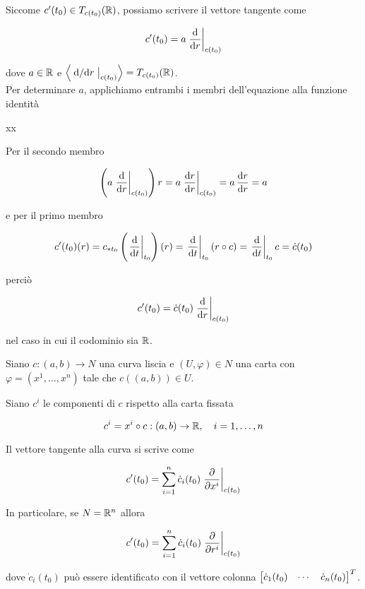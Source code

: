 Siccome $ c'(t_{0}) \in T_{c(t_{0})}(\mathbb{R}) $, possiamo scrivere il vettore tangente come

\begin{equation}
	c'(t_{0}) = a \eval{ \dv{r} }_{c(t_{0})}
\end{equation}

dove $ a \in \mathbb{R} $ e $ \ev{ \eval{ \dv*{r} }_{c(t_{0})} } = T_{c(t_{0})}(\R) $. \\
Per determinare $ a $, applichiamo entrambi i membri dell'equazione alla funzione identità

	{\R}{\R}
	{x}{x}

Per il secondo membro

\begin{equation}
	\left( a \eval{ \dv{r} }_{c(t_{0})} \right) r = a \eval{ \dv{r}{r} }_{c(t_{0})} %
	= a \, \dv{r}{r} %
	= a
\end{equation}

e per il primo membro

\begin{equation}
	c'(t_{0})(r) = c_{*t_{0}} \left( \eval{ \ddv{t} }_{t_{0}} \right)(r) %
	= \eval{ \ddv{t} }_{t_{0}} (r \circ c) %
	= \eval{ \ddv{t} }_{t_{0}} c %
	= \dot{c}(t_{0})
\end{equation}

perciò

\begin{equation}
	c'(t_{0}) = \dot{c}(t_{0}) \eval{ \dv{r} }_{c(t_{0})}
\end{equation}

nel caso in cui il codominio sia $ \mathbb{R} $.

\begin{definition}\label{prop:loc-exp-tan-cur}
	Siano $ c : (a,b) \to N $ una curva liscia e $ (U,\varphi) \in N $ una carta con $ \varphi = (x^{1},\dots,x^{n}) $ tale che $ c((a,b)) \in U $.
	
	
	Siano $ c^{i} $ le componenti di $ c $ rispetto alla carta fissata
	
	\begin{equation}
		c^{i} = x^{i} \circ c : (a,b) \to \R \qcomma i=1,\dots,n
	\end{equation}
	
	Il vettore tangente alla curva si scrive come
	
	\begin{equation}
		c'(t_{0}) = \sum_{i=1}^{n} \dot{c}_{i}(t_{0}) \eval{ \pdv{x^{i}} }_{c(t_{0})}
	\end{equation}

	In particolare, se $ N = \mathbb{R}^{n} $ allora
	
	\begin{equation}
		c'(t_{0}) = \sum_{i=1}^{n} \dot{c}_{i}(t_{0}) \eval{ \pdv{r^{i}} }_{c(t_{0})}
	\end{equation}

	dove $ \dot{c}_{i}(t_{0}) $ può essere identificato con il vettore colonna $ \bmqty{ \dot{c}_{1}(t_{0}) & \cdots & \dot{c}_{n}(t_{0}) }^{T} $.
\end{definition}

